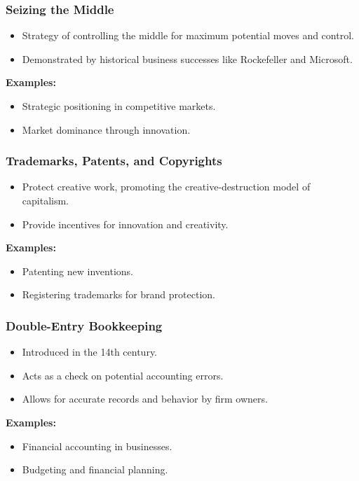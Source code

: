 \begin{frame}[fragile]\frametitle{Seizing the Middle}
\begin{itemize}
    \item Strategy of controlling the middle for maximum potential moves and control.
    \item Demonstrated by historical business successes like Rockefeller and Microsoft.
\end{itemize}
\textbf{Examples:}
\begin{itemize}
    \item Strategic positioning in competitive markets.
    \item Market dominance through innovation.
\end{itemize}
\end{frame}

\begin{frame}[fragile]\frametitle{Trademarks, Patents, and Copyrights}
\begin{itemize}
    \item Protect creative work, promoting the creative-destruction model of capitalism.
    \item Provide incentives for innovation and creativity.
\end{itemize}
\textbf{Examples:}
\begin{itemize}
    \item Patenting new inventions.
    \item Registering trademarks for brand protection.
\end{itemize}
\end{frame}

\begin{frame}[fragile]\frametitle{Double-Entry Bookkeeping}
\begin{itemize}
    \item Introduced in the 14th century.
    \item Acts as a check on potential accounting errors.
    \item Allows for accurate records and behavior by firm owners.
\end{itemize}
\textbf{Examples:}
\begin{itemize}
    \item Financial accounting in businesses.
    \item Budgeting and financial planning.
\end{itemize}
\end{frame}

